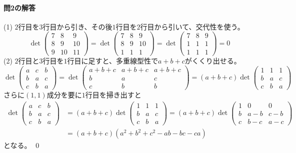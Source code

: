 \paragraph{問2の解答} (1) $2$行目を$3$行目から引き、その後$1$行目を$2$行目から引いて、交代性を使う。
\[
\det
\begin{pmatrix}
7 & 8 & 9 \\
8 & 9 & 10 \\
9 & 10 & 11 
\end{pmatrix}
=
\det
\begin{pmatrix}
7 & 8 & 9 \\
8 & 9 & 10 \\
1 & 1 & 1 
\end{pmatrix}
=
\det
\begin{pmatrix}
7 & 8 & 9 \\
1 & 1 & 1 \\
1 & 1 & 1
\end{pmatrix}
= 0
\]
(2) $2$行目と$3$行目を$1$行目に足すと、多重線型性で$a + b + c$がくくり出せる。
\[
\det
\begin{pmatrix}
a & c & b \\
b & a & c \\
c & b & a
\end{pmatrix}
=
\det
\begin{pmatrix}
a + b + c & a + b + c & a + b + c \\
b & a & c \\
c & b & b 
\end{pmatrix}
= (a + b + c) \det
\begin{pmatrix}
1 & 1 & 1 \\
b & a & c \\
c & b & a
\end{pmatrix}
\]
さらに$(1, 1)$成分を要に$1$行目を掃き出すと
\begin{align*}
\det
\begin{pmatrix}
a & c & b \\
b & a & c \\
c & b & a
\end{pmatrix}
&= 
(a + b + c) \det
\begin{pmatrix}
1 & 1 & 1 \\
b & a & c \\
c & b & a
\end{pmatrix}
=
(a + b + c) \det
\begin{pmatrix}
1 & 0 & 0 \\
b & a - b & c - b \\
c & b - c & a - c
\end{pmatrix} \\
&= (a + b + c)(a^2 + b^2 + c^2 - ab - bc - ca)
\end{align*}
となる。 \qed

